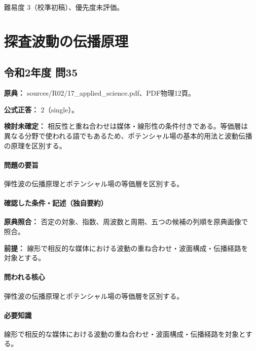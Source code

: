 \par 難易度 3（校準初稿）、優先度未評価。

\section{探査波動の伝播原理}

\subsection{令和2年度 問35}
\label{q:r02-reg-applied-35}

\noindent\textbf{原典：} sources/R02/17\_applied\_science.pdf、PDF物理12頁。

\textbf{公式正答：} 2（single）。

\par\textbf{検討未確定：} 相反性と重ね合わせは媒体・線形性の条件付きである。等価層は異なる分野で使われる語でもあるため、ポテンシャル場の基本的用法と波動伝播の原理を区別する。

\paragraph{問題の要旨} 弾性波の伝播原理とポテンシャル場の等価層を区別する。

\paragraph{確認した条件・記述（独自要約）}\mbox{}\par

\noindent\textbf{原典照合：} 否定の対象、指数、周波数と周期、五つの候補の列順を原典画像で照合。\par

\noindent\textbf{前提：} 線形で相反的な媒体における波動の重ね合わせ・波面構成・伝播経路を対象とする。\par

\paragraph{問われる核心} 弾性波の伝播原理とポテンシャル場の等価層を区別する。

\paragraph{必要知識} 線形で相反的な媒体における波動の重ね合わせ・波面構成・伝播経路を対象とする。

